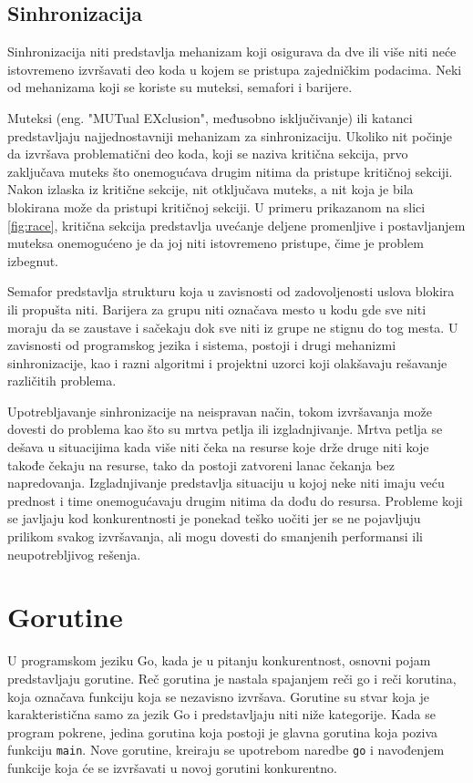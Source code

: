 \documentclass[12pt,oneside]{memoir}
\begin{document}
\subsection{Sinhronizacija}

Sinhronizacija niti predstavlja mehanizam koji osigurava da dve ili više niti neće istovremeno izvršavati deo koda u kojem se pristupa zajedničkim podacima. Neki od mehanizama koji se koriste su muteksi, semafori i barijere. 

Muteksi (eng. "MUTual EXclusion", međusobno isključivanje) ili katanci predstavljaju najjednostavniji mehanizam za sinhronizaciju. Ukoliko nit počinje da izvršava problematični deo koda, koji se naziva kritična sekcija, prvo zaključava muteks što onemogućava drugim nitima da pristupe kritičnoj sekciji. Nakon izlaska iz kritične sekcije, nit otključava muteks, a nit koja je bila blokirana može da pristupi kritičnoj sekciji. U primeru prikazanom na slici \ref{fig:race}, kritična sekcija predstavlja uvećanje deljene promenljive i postavljanjem muteksa onemogućeno je da joj niti istovremeno pristupe, čime je problem izbegnut. 

Semafor predstavlja strukturu koja u zavisnosti od zadovoljenosti uslova blokira ili propušta niti. Barijera za grupu niti označava mesto u kodu gde sve niti moraju da se zaustave i sačekaju dok sve niti iz grupe ne stignu do tog mesta. U zavisnosti od programskog jezika i sistema, postoji i drugi mehanizmi sinhronizacije, kao i razni algoritmi i projektni uzorci koji olakšavaju rešavanje različitih problema.

Upotrebljavanje sinhronizacije na neispravan način, tokom izvršavanja može dovesti do problema kao što su mrtva petlja ili izgladnjivanje. Mrtva petlja se dešava u situacijima kada više niti čeka na resurse koje drže druge niti koje takođe čekaju na resurse, tako da postoji zatvoreni lanac čekanja bez napredovanja. Izgladnjivanje predstavlja situaciju u kojoj neke niti imaju veću prednost i time onemogućavaju drugim nitima da dođu do resursa. Probleme koji se javljaju kod konkurentnosti je ponekad teško uočiti jer se ne pojavljuju prilikom svakog izvršavanja, ali mogu dovesti do smanjenih performansi ili neupotrebljivog rešenja. 

\section{Gorutine}

U programskom jeziku Go, kada je u pitanju konkurentnost, osnovni pojam predstavljaju gorutine. Reč gorutina je nastala spajanjem reči go i reči korutina, koja označava funkciju koja se nezavisno izvršava. Gorutine su stvar koja je karakteristična samo za jezik Go i predstavljaju niti niže kategorije. Kada se program pokrene, jedina gorutina koja postoji je glavna gorutina koja poziva funkciju \texttt{main}. Nove gorutine, kreiraju se upotrebom naredbe \texttt{go} i navođenjem funkcije koja će se izvršavati u novoj gorutini konkurentno. 
\end{document}
